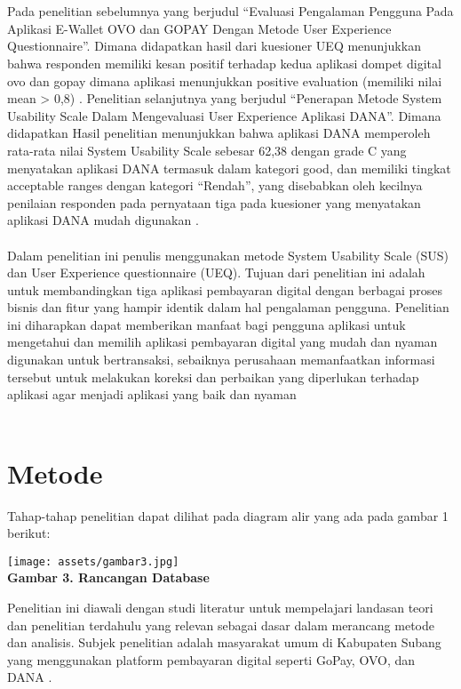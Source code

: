 \documentclass[
 manuscript=article,  %
  layout=publish, 
  year=2024, 
  month= Februari, %
  volume=8,
  number=1 
]{JIKO}
\begin{document}
\\ \\
Pada penelitian sebelumnya yang berjudul “Evaluasi Pengalaman Pengguna Pada Aplikasi E-Wallet OVO dan GOPAY Dengan Metode User Experience Questionnaire”. Dimana didapatkan hasil dari kuesioner UEQ menunjukkan bahwa responden memiliki kesan positif terhadap kedua aplikasi dompet digital ovo dan gopay dimana aplikasi menunjukkan positive evaluation (memiliki nilai mean > 0,8) \cite{2}. Penelitian selanjutnya yang berjudul “Penerapan Metode System Usability Scale Dalam Mengevaluasi User Experience Aplikasi DANA”. Dimana didapatkan Hasil penelitian menunjukkan bahwa aplikasi DANA memperoleh rata-rata nilai System Usability Scale sebesar 62,38 dengan grade C yang menyatakan aplikasi DANA termasuk dalam kategori good, dan memiliki tingkat acceptable ranges dengan kategori “Rendah”, yang disebabkan oleh kecilnya penilaian responden pada pernyataan tiga pada kuesioner yang menyatakan aplikasi DANA mudah digunakan \cite{10}.
\\ \\
Dalam penelitian ini penulis menggunakan metode System Usability Scale (SUS) dan User Experience questionnaire (UEQ). Tujuan dari penelitian ini adalah untuk membandingkan tiga aplikasi pembayaran digital dengan berbagai proses bisnis dan fitur yang hampir identik dalam hal pengalaman pengguna. Penelitian ini diharapkan dapat memberikan manfaat bagi pengguna aplikasi untuk mengetahui dan memilih aplikasi pembayaran digital yang mudah dan nyaman digunakan untuk bertransaksi, sebaiknya perusahaan memanfaatkan informasi tersebut untuk melakukan koreksi dan perbaikan yang diperlukan terhadap aplikasi agar menjadi aplikasi yang baik dan nyaman 
\\ \\

\section{Metode}
Tahap-tahap penelitian dapat dilihat pada diagram alir yang ada pada gambar 1 berikut:

\begin{center}
    \texttt{[image: assets/gambar3.jpg]}
    \\\textbf{Gambar 3. Rancangan Database}
\end{center}

\noindent\hspace{1cm}Penelitian ini diawali dengan studi literatur untuk mempelajari landasan teori dan penelitian terdahulu yang relevan sebagai dasar dalam merancang metode dan analisis. Subjek penelitian adalah masyarakat umum di Kabupaten Subang yang menggunakan platform pembayaran digital seperti GoPay, OVO, dan DANA \cite{1}.
\end{document}
